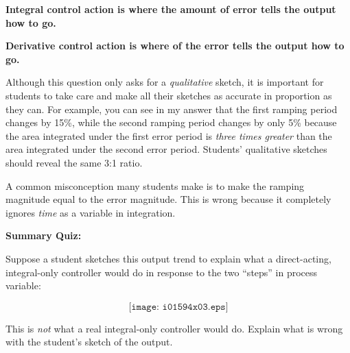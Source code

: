 {\bf Integral control action is where the amount of error tells the output how  to go.}

\vskip 10pt

{\bf Derivative control action is where  of the error tells the output how  to go.}

\vskip 10pt


Although this question only asks for a {\it qualitative} sketch, it is important for students to take care and make all their sketches as accurate in proportion as they can.  For example, you can see in my answer that the first ramping period changes by 15\%, while the second ramping period changes by only 5\% because the area integrated under the first error period is {\it three times greater} than the area integrated under the second error period.  Students' qualitative sketches should reveal the same 3:1 ratio.

A common misconception many students make is to make the ramping magnitude equal to the error magnitude.  This is wrong because it completely ignores {\it time} as a variable in integration.













\vfil \eject

\noindent
{\bf Summary Quiz:}

Suppose a student sketches this output trend to explain what a direct-acting, integral-only controller would do in response to the two ``steps'' in process variable:

$$\texttt{[image: i01594x03.eps]}$$

This is {\it not} what a real integral-only controller would do.  Explain what is wrong with the student's sketch of the output.




